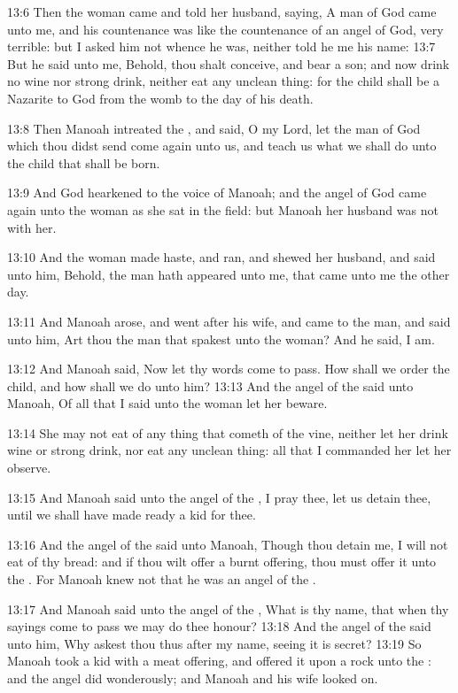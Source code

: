 13:6 Then the woman came and told her husband, saying, A man of God
came unto me, and his countenance was like the countenance of an angel
of God, very terrible: but I asked him not whence he was, neither told
he me his name: 13:7 But he said unto me, Behold, thou shalt conceive,
and bear a son; and now drink no wine nor strong drink, neither eat
any unclean thing: for the child shall be a Nazarite to God from the
womb to the day of his death.

13:8 Then Manoah intreated the \LORD, and said, O my Lord, let the man
of God which thou didst send come again unto us, and teach us what we
shall do unto the child that shall be born.

13:9 And God hearkened to the voice of Manoah; and the angel of God
came again unto the woman as she sat in the field: but Manoah her
husband was not with her.

13:10 And the woman made haste, and ran, and shewed her husband, and
said unto him, Behold, the man hath appeared unto me, that came unto
me the other day.

13:11 And Manoah arose, and went after his wife, and came to the man,
and said unto him, Art thou the man that spakest unto the woman? And
he said, I am.

13:12 And Manoah said, Now let thy words come to pass. How shall we
order the child, and how shall we do unto him?  13:13 And the angel of
the \LORD said unto Manoah, Of all that I said unto the woman let her
beware.

13:14 She may not eat of any thing that cometh of the vine, neither
let her drink wine or strong drink, nor eat any unclean thing: all
that I commanded her let her observe.

13:15 And Manoah said unto the angel of the \LORD, I pray thee, let us
detain thee, until we shall have made ready a kid for thee.

13:16 And the angel of the \LORD said unto Manoah, Though thou detain
me, I will not eat of thy bread: and if thou wilt offer a burnt
offering, thou must offer it unto the \LORD. For Manoah knew not that
he was an angel of the \LORD.

13:17 And Manoah said unto the angel of the \LORD, What is thy name,
that when thy sayings come to pass we may do thee honour?  13:18 And
the angel of the \LORD said unto him, Why askest thou thus after my
name, seeing it is secret?  13:19 So Manoah took a kid with a meat
offering, and offered it upon a rock unto the \LORD: and the angel did
wonderously; and Manoah and his wife looked on.

